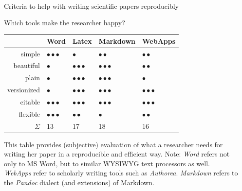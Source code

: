 \documentclass[final,hyperref={pdfpagelabels=false}]{beamer}
\begin{document}
\begin{frame}{}
\begin{columns}[t]
\begin{column}{.48\linewidth}
\begin{block}{Criteria to help with writing scientific papers reproducibly}
\begin{itemize}
	
       \end{itemize}
        \end{block}



   
     \begin{block}{Which tools make the researcher happy?}
    \begin{center}
\begin{tabular}{rllll}
  \hline
 & Word & Latex & Markdown & WebApps \\ 
  \hline
simple &  $\bullet\bullet\bullet$ & $\bullet$ & $\bullet\bullet$ & $\bullet\bullet$ \\ 
  beautiful & $\bullet$ & $\bullet\bullet\bullet$ & $\bullet\bullet\bullet$ &  $\bullet\bullet$ \\ 
  plain & $\bullet$ & $\bullet\bullet\bullet$ & $\bullet\bullet\bullet$ & $\bullet$ \\ 
  versionized & $\bullet$ & $\bullet\bullet\bullet$ & $\bullet\bullet\bullet$ & $\bullet\bullet\bullet$ \\ 
  citable & $\bullet\bullet\bullet$ & $\bullet\bullet\bullet$ & $\bullet\bullet\bullet$ & $\bullet\bullet\bullet$ \\ 
  flexible & $\bullet\bullet\bullet$ &  $\bullet\bullet$ & $\bullet$ &  $\bullet\bullet$ \\ 
   \hline
   $\Sigma$ & 13 & 17 & 18 & 16\\
   \hline
\end{tabular}
\end{center}
\bigskip

This table provides (subjective) evaluation of what a researcher needs for writing her paper in a reproducible and efficient way. Note: \emph{Word} refers not only to MS Word, but to similar WYSIWYG text processors as well. \emph{WebApps} refer to scholarly writing tools such as \emph{Authorea}. \emph{Markdown} refers to the \emph{Pandoc} dialect (and extensions) of Markdown.
   
        \end{block}
 
      
      \end{column}
      
            
      
      \begin{column}{.48\linewidth} 
          

\end{column}
\end{columns}
\end{frame}
\end{document}
